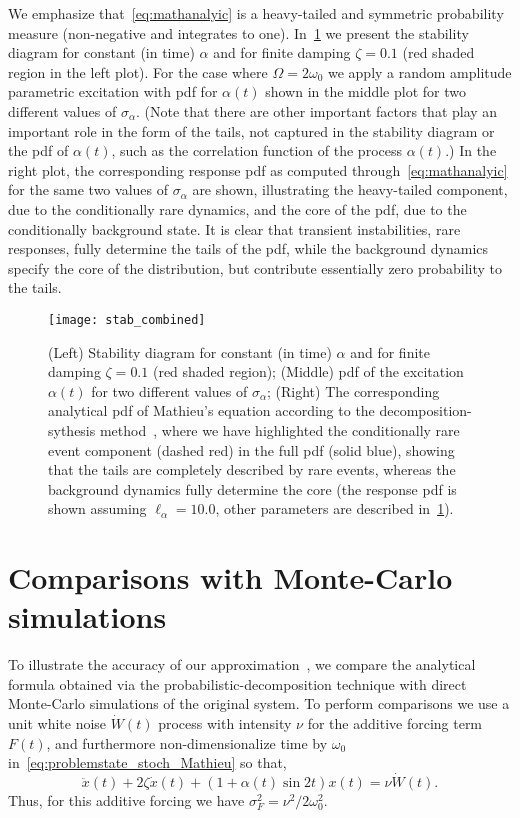 \documentclass[3p]{elsarticle}
\begin{document}
We emphasize that~\cref{eq:mathanalyic} is a heavy-tailed and symmetric  probability measure (non-negative and integrates to one). In~\cref{fig:superpos} we  present the stability diagram for constant (in time) $\alpha$ and for finite damping $\zeta=0.1$ (red shaded region in the left plot). For the case where  $\Omega=2\omega_0$ we apply a random amplitude parametric excitation with pdf for $\alpha(t)$ shown in the middle plot for two different values of $\sigma_{\alpha}$. (Note that there are other important factors that play an important role in the form of the tails, not captured in the stability diagram or the pdf of $\alpha(t)$, such as the correlation function of the process $\alpha(t)$.) In the right plot,  the corresponding response pdf as computed through~\cref{eq:mathanalyic} for the same two values of $\sigma_{\alpha}$ are shown, illustrating the heavy-tailed component, due to the conditionally rare dynamics, and the core of the pdf, due to the conditionally background state. It is clear that   transient instabilities, rare responses,     fully determine the tails of the pdf, while the background dynamics  specify    the core of the   distribution, but contribute essentially zero probability to the tails.
\begin{figure}[htb]
    \centering
                \texttt{[image: stab\_combined]}
    \caption{(Left) Stability diagram for constant (in time) $\alpha$ and for finite damping $\zeta=0.1$ (red shaded region); (Middle) pdf of the excitation $\alpha(t)$ for two different values of $\sigma_{\alpha}$; (Right) The corresponding analytical pdf of Mathieu's equation according to the decomposition-sythesis method~, where we have  highlighted the conditionally rare event component  (dashed red) in the full pdf (solid blue),  showing that the tails are completely described by rare events, whereas the background dynamics fully determine the core  (the response pdf is shown assuming $\ell_\alpha = 10.0$,   other parameters are described in~\cref{sec:comps}).}
    \label{fig:superpos}
\end{figure}


\section{Comparisons with Monte-Carlo simulations}\label{sec:comps}

To illustrate the accuracy of our approximation~,  we compare the analytical formula obtained via the probabilistic-decomposition technique with direct Monte-Carlo simulations of the original system. To perform comparisons we use a unit  white noise $\dot W(t)$ process with intensity $\nu$ for the additive forcing term $F(t)$, and furthermore non-dimensionalize time by $\omega_0$ in~\cref{eq:problemstate_stoch_Mathieu} so that, 
\begin{equation}\label{eq:referenceEqMC}
\ddot x(t) + 2   \zeta   \dot x(t) +  ( 1 +   \alpha(t)  \sin  2   t )  x(t) =     \nu  \dot W(t).
\end{equation}
Thus, for this additive forcing we have $\sigma_F^2 = \nu^2/2\omega_0^2$.
\end{document}
